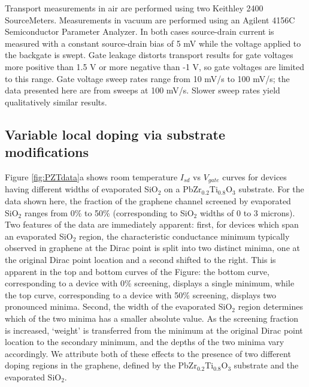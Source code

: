 \documentclass[edeposit,fullpage,draftthesis]{uiucthesis2009}
\begin{document}
Transport measurements in air are performed using two Keithley 2400 SourceMeters. Measurements in vacuum are performed using an Agilent 4156C Semiconductor Parameter Analyzer. In both cases source-drain current is measured with a constant source-drain bias of 5 mV while the voltage applied to the backgate is swept. Gate leakage distorts transport results for gate voltages more positive than 1.5 V or more negative than -1 V, so gate voltages are limited to this range. Gate voltage sweep rates range from 10 mV/s to 100 mV/s; the data presented here are from sweeps at 100 mV/s. Slower sweep rates yield qualitatively similar results.


    \subsection{Variable local doping via substrate modifications}
    
        Figure \ref{fig:PZTdata}a shows room temperature $I_{sd}$ vs $V_{gate}$ curves for devices having different widths of evaporated SiO$_2$ on a PbZr$_{0.2}$Ti$_{0.8}$O$_3$ substrate. For the data shown here, the fraction of the graphene channel screened by evaporated SiO$_2$ ranges from 0\% to 50\% (corresponding to SiO$_2$ widths of 0 to 3 microns). Two features of the data are immediately apparent: first, for devices which span an evaporated SiO$_2$ region, the characteristic conductance minimum typically observed in graphene at the Dirac point is split into two distinct minima, one at the original Dirac point location and a second shifted to the right. This is apparent in the top and bottom curves of the Figure: the bottom curve, corresponding to a device with 0\% screening, displays a single minimum, while the top curve, corresponding to a device with 50\% screening, displays two pronounced minima. Second, the width of the evaporated SiO$_2$ region determines which of the two minima has a smaller absolute value. As the screening fraction is increased, `weight' is transferred from the minimum at the original Dirac point location to the secondary minimum, and the depths of the two minima vary accordingly. We attribute both of these effects to the presence of two different doping regions in the graphene, defined by the PbZr$_{0.2}$Ti$_{0.8}$O$_3$ substrate and the evaporated SiO$_2$.
\end{document}
